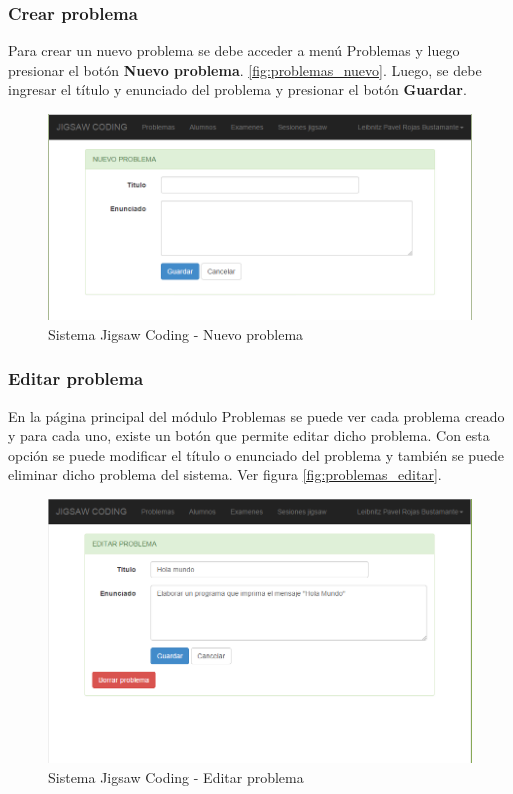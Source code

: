 \subsubsection{Crear problema}

Para crear un nuevo problema se debe acceder a menú Problemas y luego presionar el botón \textbf{Nuevo problema}. \autoref{fig:problemas_nuevo}. Luego, se debe ingresar el título y enunciado del problema y presionar el botón \textbf{Guardar}.

\begin{figure}[h!]
\centering
\caption[SJC Nuevo problema]{Sistema Jigsaw Coding - Nuevo problema}
\label{fig:problemas_nuevo}
\includegraphics[scale=0.5]{figuras/usodelsistema/docente/problemas_nuevo}
\end{figure}

\subsubsection{Editar problema}
En la página principal del módulo Problemas se puede ver cada problema creado y para cada uno, existe un botón que permite editar dicho problema. Con esta opción se puede modificar el título o enunciado del problema y también se puede eliminar dicho problema del sistema. Ver figura \autoref{fig:problemas_editar}.

\begin{figure}[h!]
\centering
\caption[SJC Editar problema]{Sistema Jigsaw Coding - Editar problema}
\label{fig:problemas_editar}
\includegraphics[scale=0.5]{figuras/usodelsistema/docente/problemas_editar}
\end{figure}

